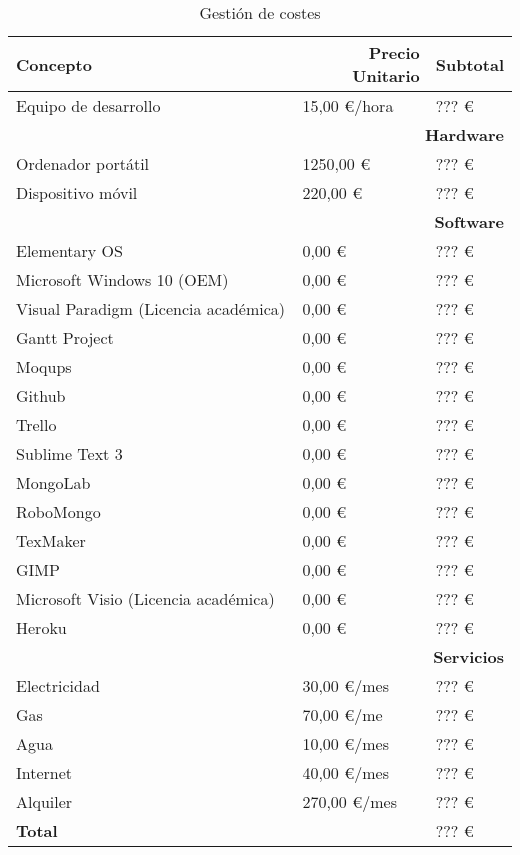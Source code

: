 	\begin{table}[H]
	  \centering 
	  \begin{tabular}{p{0.7\linewidth}p{0.3\linewidth}p{0.3\linewidth}}
	  	\multicolumn{1}{l}{\cellcolor{black!30}\textbf{Concepto}} &
	    \multicolumn{1}{r}{\cellcolor{black!30}\textbf{Precio Unitario}} & 
	 	\multicolumn{1}{r}{\cellcolor{black!30}\textbf{Subtotal}}
	 	\\	 
	    \toprule
		Equipo de desarrollo 					&	15,00 \euro /hora	&	??? \euro	\\
		
		\multicolumn{3}{r}{\cellcolor{black!30}\textbf{Hardware}}						\\			
		Ordenador portátil						&	1250,00 \euro		&	??? \euro	\\
		Dispositivo móvil						&	220,00 \euro		&	??? \euro	\\

		\multicolumn{3}{r}{\cellcolor{black!30}\textbf{Software}}						\\
		Elementary OS							&	0,00 \euro			&	??? \euro	\\
		Microsoft Windows 10 (\ac{OEM})		&	0,00 \euro			&	???	\euro	\\
		Visual Paradigm	(Licencia académica)	&	0,00 \euro			&	??? \euro	\\
		Gantt Project							&	0,00 \euro			&	??? \euro	\\
		Moqups									&	0,00 \euro			&	??? \euro	\\
		Github									&	0,00 \euro			&	???	\euro	\\
		Trello									&	0,00 \euro			&	??? \euro	\\
		Sublime Text 3							&	0,00 \euro			&	??? \euro	\\
		MongoLab								&	0,00 \euro			&	??? \euro	\\
		RoboMongo								&	0,00 \euro			&	??? \euro	\\
		TexMaker								&	0,00 \euro			&	??? \euro	\\
		GIMP									&	0,00 \euro			&	??? \euro	\\
		Microsoft Visio	(Licencia académica)	&	0,00 \euro			&	??? \euro	\\
		Heroku									&	0,00 \euro			&	???	\euro	\\

		\multicolumn{3}{r}{\cellcolor{black!30}\textbf{Servicios}}						\\			
		Electricidad							&	30,00 \euro	/mes	&	???	\euro	\\
		Gas										&	70,00 \euro /me		&	??? \euro	\\
		Agua									&	10,00 \euro	/mes	&	??? \euro	\\
		Internet								&	40,00 \euro	/mes	&	??? \euro	\\
		Alquiler								&	270,00 \euro /mes	&	??? \euro	\\
		\textbf{Total} 							&						&	??? \euro	\\
	    \hline
	  \end{tabular}
	  \caption{Gestión de costes}
	  \label{tab:costes}
	\end{table}

